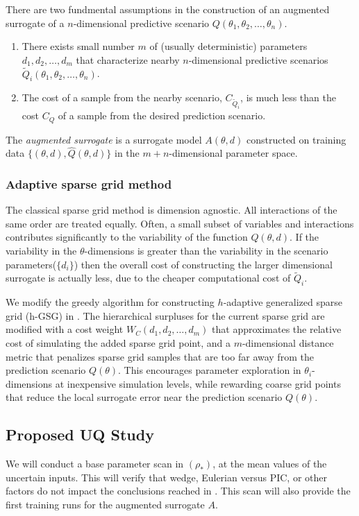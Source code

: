 \documentclass{article}
\begin{document}
There are two fundmental assumptions in the construction of an augmented surrogate of
a $n$-dimensional predictive scenario $Q(\theta_1,\theta_2,\ldots,\theta_n)$.
\begin{enumerate}
\item There exists small number $m$ of (usually deterministic) parameters $d_1,d_2,\ldots,d_m$ that characterize
nearby $n$-dimensional predictive scenarios $\tilde{Q}_i(\theta_1,\theta_2,\ldots,\theta_n)$.
\item The cost of a sample from the nearby scenario, $C_{\tilde{Q}_i}$, is much less than the cost $C_Q$ of 
a sample from the desired prediction scenario.
\end{enumerate} 

The {\em augmented surrogate} is a surrogate model $A(\theta,d)$ constructed on training data $\{(\theta,d),\hat{Q}(\theta,d)\}$ in the $m+n$-dimensional
parameter space.   %

\subsubsection*{Adaptive sparse grid method}  
The classical sparse grid method is dimension agnostic\cite{bungartz2004}. All interactions
of the same order are treated equally. Often, a small subset of variables
and interactions contributes significantly to the variability of the function $Q(\theta,d)$.  If the variability in the $\theta$-dimensions is
greater than the variability in the scenario parameters($\{d_i\}$) then the overall cost of constructing the 
larger dimensional surrogate is actually less, due to the cheaper computational cost of $\tilde{Q}_i$.

We modify the 
greedy algorithm for constructing $h$-adaptive generalized sparse grid (h-GSG) in \cite{Jakeman2011LocalAD}.
The hierarchical surpluses for the current sparse grid are modified with a cost weight $W_C(d_1,d_2,\ldots,d_m)$ that approximates the relative
cost of simulating the added sparse grid point, and a $m$-dimensional distance metric that penalizes sparse grid
samples that are too far away from the prediction scenario $Q(\theta)$.  This encourages parameter exploration in $\theta_i$-dimensions at
inexpensive simulation levels, while rewarding coarse grid points that reduce the local surrogate error near the prediction scenario $Q(\theta)$.  

\subsection{Proposed UQ Study}
We will conduct a base parameter scan in $(\rho_*)$, at the mean values of the uncertain inputs.  This will verify that wedge, Eulerian versus PIC, or other factors do not impact the conclusions reached in \cite{Yas_Ido}.  This scan will also provide the first training runs for
the augmented surrogate $A$.  
\end{document}
